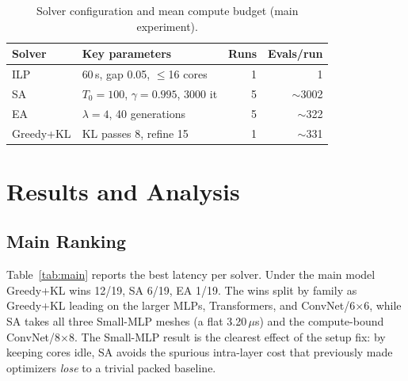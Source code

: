\documentclass[conference]{IEEEtran}
\begin{document}
\begin{table}[t]
\centering
\caption{Solver configuration and mean compute budget (main experiment).}
\label{tab:solver}
\footnotesize
\setlength{\tabcolsep}{3pt}
\begin{tabular}{llrr}
\toprule
Solver & Key parameters & Runs & Evals/run \\
\midrule
ILP & 60\,s, gap 0.05, $\le$16 cores & 1 & 1 \\
SA & $T_0{=}100$, $\gamma{=}0.995$, 3000 it & 5 & $\sim$3002 \\
EA & $\lambda{=}4$, 40 generations & 5 & $\sim$322 \\
Greedy+KL & KL passes 8, refine 15 & 1 & $\sim$331 \\
\bottomrule
\end{tabular}
\end{table}

\section{Results and Analysis}
\subsection{Main Ranking}
Table~\ref{tab:main} reports the best latency per solver. Under the main model Greedy+KL wins 12/19, SA 6/19, EA 1/19. The wins split by family as Greedy+KL leading on the larger MLPs, Transformers, and ConvNet/6$\times$6, while SA takes all three Small-MLP meshes (a flat 3.20\,$\mu$s) and the compute-bound ConvNet/8$\times$8. The Small-MLP result is the clearest effect of the setup fix: by keeping cores idle, SA avoids the spurious intra-layer cost that previously made optimizers \emph{lose} to a trivial packed baseline.
\end{document}
